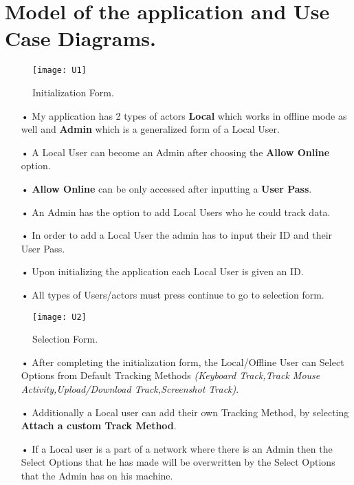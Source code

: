 \setlength{\parindent}{2ex}
\section{Model of the application and Use Case Diagrams.}
\begin{figure}[h!]
	\centering
	\texttt{[image: U1]}
	\caption{Initialization Form.} 
\end{figure}
\begin{flushleft}
\begin{enumerate}
		\item[•] My application has 2 types of actors \textbf{Local} which works in offline mode as well and \textbf{Admin} which is a generalized form of a Local User.
    	\item[•] A Local User can become an Admin after choosing the \textbf{Allow Online} option.
    	\item[•] \textbf{Allow Online} can be only accessed after inputting a \textbf{User Pass}. 
    	\item[•] An Admin has the option to add Local Users who he could track data.
      	\item[•] In order to add a Local User the admin has to input their ID and their User Pass.
    	\item[•] Upon initializing the application each Local User is given an ID. 
    	\item[•] All types of Users/actors must press continue to go to selection form.
\end{enumerate}
\end{flushleft}

\newpage \begin{figure}[h!]
	\centering
	\texttt{[image: U2]}
	\caption{Selection Form.} 
\end{figure}
\begin{flushleft}
\begin{enumerate}
		\item[•] After completing the initialization form, the Local/Offline User can Select Options from Default Tracking Methods \textit{(Keyboard Track,Track Mouse Activity,Upload/Download Track,Screenshot Track)}.
		\item[•] Additionally a Local user can add their own Tracking Method, by selecting \textbf{Attach a custom Track Method}.
		\item[•] If a Local user is a part of a network where there is an Admin then the Select Options that he has made will be overwritten by the Select Options that the Admin has on his machine.
\end{enumerate}
\end{flushleft}

